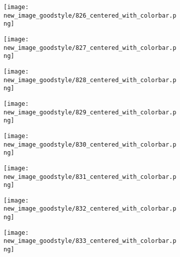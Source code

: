 \documentclass[a4paper,12pt]{article}
\begin{document}
\begin{figure}[H]
  \begin{subfigure}{0.11\textwidth}
    \texttt{[image: new\_image\_goodstyle/826\_centered\_with\_colorbar.png]}
  \end{subfigure}
  \hfill
  \begin{subfigure}{0.11\textwidth}
    \texttt{[image: new\_image\_goodstyle/827\_centered\_with\_colorbar.png]}
  \end{subfigure}
  \hfill
  \begin{subfigure}{0.11\textwidth}
    \texttt{[image: new\_image\_goodstyle/828\_centered\_with\_colorbar.png]}
  \end{subfigure}
  \hfill
  \begin{subfigure}{0.11\textwidth}
    \texttt{[image: new\_image\_goodstyle/829\_centered\_with\_colorbar.png]}
  \end{subfigure}
  \hfill
  \begin{subfigure}{0.11\textwidth}
    \texttt{[image: new\_image\_goodstyle/830\_centered\_with\_colorbar.png]}
  \end{subfigure}
  \hfill
  \begin{subfigure}{0.11\textwidth}
    \texttt{[image: new\_image\_goodstyle/831\_centered\_with\_colorbar.png]}
  \end{subfigure}
  \hfill
  \begin{subfigure}{0.11\textwidth}
    \texttt{[image: new\_image\_goodstyle/832\_centered\_with\_colorbar.png]}
  \end{subfigure}
  \hfill
  \begin{subfigure}{0.11\textwidth}
    \texttt{[image: new\_image\_goodstyle/833\_centered\_with\_colorbar.png]}
  \end{subfigure}
  \hfill
\end{figure}
\end{document}
